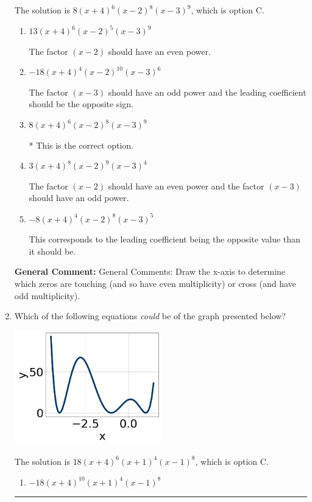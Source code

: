 \documentclass{extbook}[14pt]
\newcommand{\litem}[1]{\item #1

\rule{\textwidth}{0.4pt}}
\begin{document}
\begin{enumerate}
{The solution is \( 8(x + 4)^{6} (x - 2)^{8} (x - 3)^{9} \), which is option C.\begin{enumerate}[label=\Alph*.]
\item \( 13(x + 4)^{6} (x - 2)^{5} (x - 3)^{9} \)

The factor $(x - 2)$ should have an even power.
\item \( -18(x + 4)^{4} (x - 2)^{10} (x - 3)^{6} \)

The factor $(x - 3)$ should have an odd power and the leading coefficient should be the opposite sign.
\item \( 8(x + 4)^{6} (x - 2)^{8} (x - 3)^{9} \)

* This is the correct option.
\item \( 3(x + 4)^{8} (x - 2)^{9} (x - 3)^{4} \)

The factor $(x - 2)$ should have an even power and the factor $(x - 3)$ should have an odd power.
\item \( -8(x + 4)^{4} (x - 2)^{8} (x - 3)^{5} \)

This corresponds to the leading coefficient being the opposite value than it should be.
\end{enumerate}

\textbf{General Comment:} General Comments: Draw the x-axis to determine which zeros are touching (and so have even multiplicity) or cross (and have odd multiplicity).
}
\litem{
Which of the following equations \textit{could} be of the graph presented below?

\begin{center}
    \includegraphics[width=0.5\textwidth]{../Figures/polyGraphToFunctionCopyC.png}
\end{center}


The solution is \( 18(x + 4)^{6} (x + 1)^{4} (x - 1)^{8} \), which is option C.\begin{enumerate}[label=\Alph*.]
\item \( -18(x + 4)^{10} (x + 1)^{4} (x - 1)^{8} \)


\end{enumerate}}
\end{enumerate}
\end{document}

